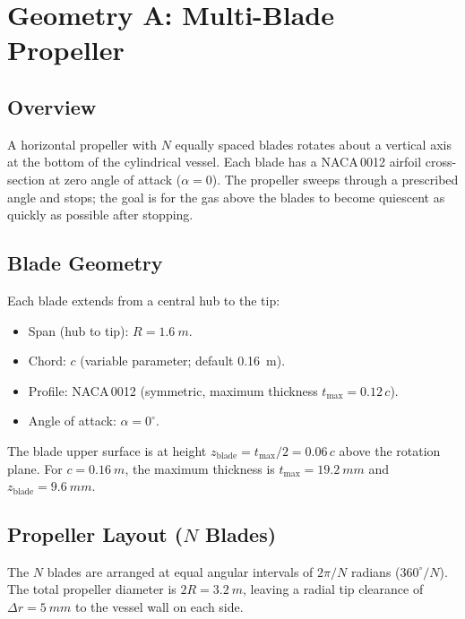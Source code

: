 \documentclass[11pt,a4paper]{article}
\begin{document}
\section{Geometry A: Multi-Blade Propeller}
\label{sec:propeller}

\subsection{Overview}

A horizontal propeller with $N$ equally spaced blades rotates about a
vertical axis at the bottom of the cylindrical vessel. Each blade has a
NACA\,0012 airfoil cross-section at zero angle of attack ($\alpha = 0$).
The propeller sweeps through a prescribed angle and stops; the goal is
for the gas above the blades to become quiescent as quickly as possible
after stopping.

\subsection{Blade Geometry}

Each blade extends from a central hub to the tip:
\begin{itemize}
  \item Span (hub to tip): $R = \SI{1.6}{m}$.
  \item Chord: $c$ (variable parameter; default \SI{0.16}{m}).
  \item Profile: NACA\,0012 (symmetric, maximum thickness
        $t_\mathrm{max} = 0.12\,c$).
  \item Angle of attack: $\alpha = 0^\circ$.
\end{itemize}

The blade upper surface is at height $z_\mathrm{blade} = t_\mathrm{max}/2
= 0.06\,c$ above the rotation plane. For $c = \SI{0.16}{m}$, the
maximum thickness is $t_\mathrm{max} = \SI{19.2}{mm}$ and
$z_\mathrm{blade} = \SI{9.6}{mm}$.

\subsection{Propeller Layout ($N$ Blades)}

The $N$ blades are arranged at equal angular intervals of $2\pi/N$
radians ($360^\circ/N$). The total propeller diameter is $2R = \SI{3.2}{m}$,
leaving a radial tip clearance of $\Delta r = \SI{5}{mm}$ to the
vessel wall on each side.
\end{document}
